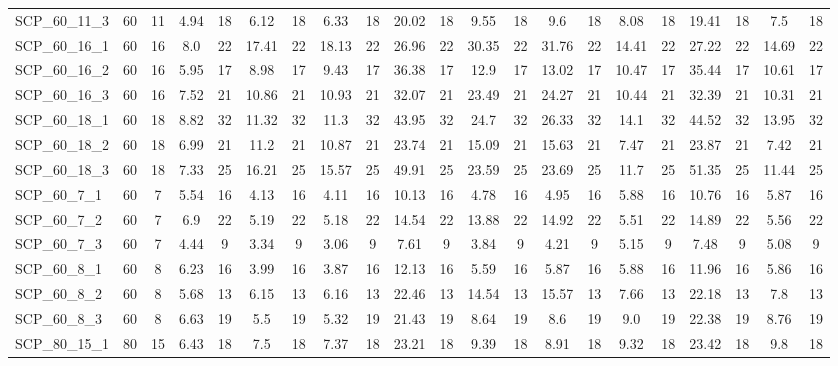 \begin{sidewaystable}[!ht]
{\begin{tabular}{lcccccccccccccccccccc}
SCP\_60\_11\_3 & 60 & 11 &  \textcolor{blue2}{4.94} & 18 & 6.12 & 18 & 6.33 & 18 & 20.02 & 18 & 9.55 & 18 & 9.6 & 18 & 8.08 & 18 & 19.41 & 18 & 7.5 & 18 \\
SCP\_60\_16\_1 & 60 & 16 &  \textcolor{blue2}{8.0} & 22 & 17.41 & 22 & 18.13 & 22 & 26.96 & 22 & 30.35 & 22 & 31.76 & 22 & 14.41 & 22 & 27.22 & 22 & 14.69 & 22 \\
SCP\_60\_16\_2 & 60 & 16 &  \textcolor{blue2}{5.95} & 17 & 8.98 & 17 & 9.43 & 17 & 36.38 & 17 & 12.9 & 17 & 13.02 & 17 & 10.47 & 17 & 35.44 & 17 & 10.61 & 17 \\
SCP\_60\_16\_3 & 60 & 16 &  \textcolor{blue2}{7.52} & 21 & 10.86 & 21 & 10.93 & 21 & 32.07 & 21 & 23.49 & 21 & 24.27 & 21 & 10.44 & 21 & 32.39 & 21 & 10.31 & 21 \\
SCP\_60\_18\_1 & 60 & 18 &  \textcolor{blue2}{8.82} & 32 & 11.32 & 32 & 11.3 & 32 & 43.95 & 32 & 24.7 & 32 & 26.33 & 32 & 14.1 & 32 & 44.52 & 32 & 13.95 & 32 \\
SCP\_60\_18\_2 & 60 & 18 &  \textcolor{blue2}{6.99} & 21 & 11.2 & 21 & 10.87 & 21 & 23.74 & 21 & 15.09 & 21 & 15.63 & 21 & 7.47 & 21 & 23.87 & 21 & 7.42 & 21 \\
SCP\_60\_18\_3 & 60 & 18 &  \textcolor{blue2}{7.33} & 25 & 16.21 & 25 & 15.57 & 25 & 49.91 & 25 & 23.59 & 25 & 23.69 & 25 & 11.7 & 25 & 51.35 & 25 & 11.44 & 25 \\
SCP\_60\_7\_1 & 60 & 7 & 5.54 & 16 & 4.13 & 16 &  \textcolor{blue2}{4.11} & 16 & 10.13 & 16 & 4.78 & 16 & 4.95 & 16 & 5.88 & 16 & 10.76 & 16 & 5.87 & 16 \\
SCP\_60\_7\_2 & 60 & 7 & 6.9 & 22 & 5.19 & 22 &  \textcolor{blue2}{5.18} & 22 & 14.54 & 22 & 13.88 & 22 & 14.92 & 22 & 5.51 & 22 & 14.89 & 22 & 5.56 & 22 \\
SCP\_60\_7\_3 & 60 & 7 & 4.44 & 9 & 3.34 & 9 &  \textcolor{blue2}{3.06} & 9 & 7.61 & 9 & 3.84 & 9 & 4.21 & 9 & 5.15 & 9 & 7.48 & 9 & 5.08 & 9 \\
SCP\_60\_8\_1 & 60 & 8 & 6.23 & 16 & 3.99 & 16 &  \textcolor{blue2}{3.87} & 16 & 12.13 & 16 & 5.59 & 16 & 5.87 & 16 & 5.88 & 16 & 11.96 & 16 & 5.86 & 16 \\
SCP\_60\_8\_2 & 60 & 8 &  \textcolor{blue2}{5.68} & 13 & 6.15 & 13 & 6.16 & 13 & 22.46 & 13 & 14.54 & 13 & 15.57 & 13 & 7.66 & 13 & 22.18 & 13 & 7.8 & 13 \\
SCP\_60\_8\_3 & 60 & 8 & 6.63 & 19 & 5.5 & 19 &  \textcolor{blue2}{5.32} & 19 & 21.43 & 19 & 8.64 & 19 & 8.6 & 19 & 9.0 & 19 & 22.38 & 19 & 8.76 & 19 \\
SCP\_80\_15\_1 & 80 & 15 &  \textcolor{blue2}{6.43} & 18 & 7.5 & 18 & 7.37 & 18 & 23.21 & 18 & 9.39 & 18 & 8.91 & 18 & 9.32 & 18 & 23.42 & 18 & 9.8 & 18 \\

\end{tabular}}
\end{sidewaystable}
